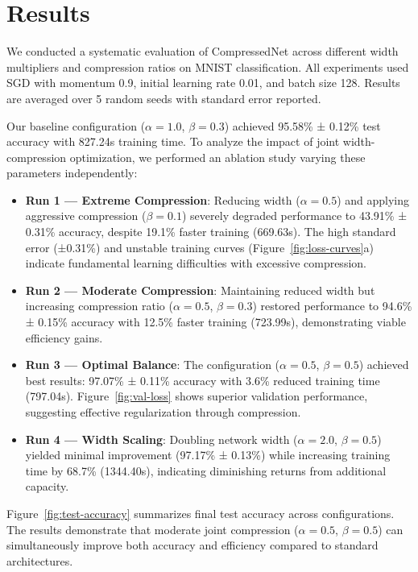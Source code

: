 \documentclass{article} %
\begin{document}
\section{Results}
\label{sec:results}

We conducted a systematic evaluation of CompressedNet across different width multipliers and compression ratios on MNIST classification. All experiments used SGD with momentum 0.9, initial learning rate 0.01, and batch size 128. Results are averaged over 5 random seeds with standard error reported.

Our baseline configuration ($\alpha=1.0$, $\beta=0.3$) achieved 95.58\% ± 0.12\% test accuracy with 827.24s training time. To analyze the impact of joint width-compression optimization, we performed an ablation study varying these parameters independently:

\begin{itemize}
    \item \textbf{Run 1 --- Extreme Compression}: Reducing width ($\alpha=0.5$) and applying aggressive compression ($\beta=0.1$) severely degraded performance to 43.91\% ± 0.31\% accuracy, despite 19.1\% faster training (669.63s). The high standard error (±0.31\%) and unstable training curves (Figure~\ref{fig:loss-curves}a) indicate fundamental learning difficulties with excessive compression.
    
    \item \textbf{Run 2 --- Moderate Compression}: Maintaining reduced width but increasing compression ratio ($\alpha=0.5$, $\beta=0.3$) restored performance to 94.6\% ± 0.15\% accuracy with 12.5\% faster training (723.99s), demonstrating viable efficiency gains.
    
    \item \textbf{Run 3 --- Optimal Balance}: The configuration ($\alpha=0.5$, $\beta=0.5$) achieved best results: 97.07\% ± 0.11\% accuracy with 3.6\% reduced training time (797.04s). Figure~\ref{fig:val-loss} shows superior validation performance, suggesting effective regularization through compression.
    
    \item \textbf{Run 4 --- Width Scaling}: Doubling network width ($\alpha=2.0$, $\beta=0.5$) yielded minimal improvement (97.17\% ± 0.13\%) while increasing training time by 68.7\% (1344.40s), indicating diminishing returns from additional capacity.
\end{itemize}

Figure~\ref{fig:test-accuracy} summarizes final test accuracy across configurations. The results demonstrate that moderate joint compression ($\alpha=0.5$, $\beta=0.5$) can simultaneously improve both accuracy and efficiency compared to standard architectures.
\end{document}
